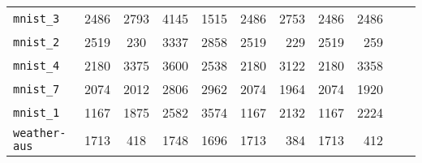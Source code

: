\begin{tabular}{lccrrrrrrrr}
\texttt{mnist\_3} & 2486 & 2793 & 4145 & 1515 & 2486 & 2753 & 2486 & 2486\\
\texttt{mnist\_2} & 2519 & 230 & 3337 & 2858 & 2519 & 229 & 2519 & 259\\
\texttt{mnist\_4} & 2180 & 3375 & 3600 & 2538 & 2180 & 3122 & 2180 & 3358\\
\texttt{mnist\_7} & 2074 & 2012 & 2806 & 2962 & 2074 & 1964 & 2074 & 1920\\
\texttt{mnist\_1} & 1167 & 1875 & 2582 & 3574 & 1167 & 2132 & 1167 & 2224\\
\texttt{weather-aus} & 1713 & 418 & 1748 & 1696 & 1713 & 384 & 1713 & 412\\
\bottomrule
\end{tabular}
